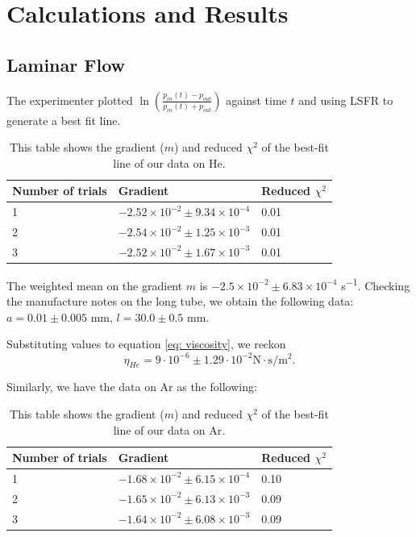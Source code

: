 \documentclass[12pt,a4paper]{article}
\begin{document}
	\section{Calculations and Results}
	\subsection{Laminar Flow}
	The experimenter plotted $\ln (\frac{p_{in}(t)-p_{out}}{p_{in}(t)+p_{out}})$ against time $t$ and using LSFR to generate a best fit line.
			\begin{table}[h!]
			 \begin{tabu}{*{3}{X[c]}}
    			\toprule
    				Number of trials & Gradient & Reduced $\chi^2$\\
    			 & $ -2.52 \times 10^{-2} \pm 9.34 \times 10^{-4}$ & 0.01 \\ 
      				2 & $ -2.54 \times 10^{-2} \pm 1.25 \times 10^{-3}$ & 0.01  \\ 
       				3 & $ -2.52 \times 10^{-2} \pm 1.67 \times 10^{-3}$ &0.01  \\
   				 \bottomrule
    		\end{tabu}
    		\caption{This table shows the gradient ($m$) and reduced $\chi^2$ of the best-fit line of our data on He.}
		\end{table}
	
	The weighted mean on the gradient $m$ is $-2.5 \times 10^{-2} \pm 6.83 \times 10^{-4}$ \si{\second^{-1}}.		
	Checking the manufacture notes on the long tube, we obtain the following data:
	$a=0.01 \pm 0.005$ mm,  $l=30.0 \pm 0.5$ mm.
	
	Substituting values to equation \ref{eq: viscosity}, we reckon
	\begin{equation*}
		\eta_{He}= 9 \cdot 10^{-6} \pm 1.29 \cdot 10^{-2} \si{\newton\cdot\second\per\metre^2}.
	\end{equation*}
	
	Similarly, we have the data on Ar as the following:
	\begin{table}[h!]
			 \begin{tabu}{*{3}{X[c]}}
    			\toprule
    				Number of trials & Gradient & Reduced $\chi^2$\\
    			 & $ -1.68 \times 10^{-2} \pm 6.15 \times 10^{-4}$ & 0.10\\ 
      				2 & $ -1.65 \times 10^{-2} \pm 6.13 \times 10^{-3}$ & 0.09\\ 
       				3 & $ -1.64 \times 10^{-2} \pm 6.08 \times 10^{-3}$ & 0.09\\
   				 \bottomrule
    		\end{tabu}
    		\caption{This table shows the gradient ($m$) and reduced $\chi^2$ of the best-fit line of our data on Ar.}
		\end{table}
		
\end{document}
